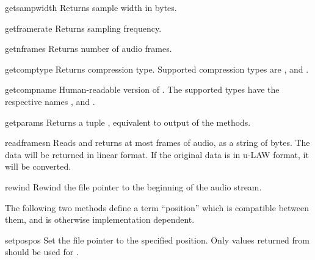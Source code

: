 \begin{methoddesc}[AU_read]{getsampwidth}{}
Returns sample width in bytes.
\end{methoddesc}

\begin{methoddesc}[AU_read]{getframerate}{}
Returns sampling frequency.
\end{methoddesc}

\begin{methoddesc}[AU_read]{getnframes}{}
Returns number of audio frames.
\end{methoddesc}

\begin{methoddesc}[AU_read]{getcomptype}{}
Returns compression type.
Supported compression types are ,  and .
\end{methoddesc}

\begin{methoddesc}[AU_read]{getcompname}{}
Human-readable version of . 
The supported types have the respective names ,  and .
\end{methoddesc}

\begin{methoddesc}[AU_read]{getparams}{}
Returns a tuple ,
equivalent to output of the  methods.
\end{methoddesc}

\begin{methoddesc}[AU_read]{readframes}{n}
Reads and returns at most  frames of audio, as a string of
bytes.  The data will be returned in linear format.  If the original
data is in u-LAW format, it will be converted.
\end{methoddesc}

\begin{methoddesc}[AU_read]{rewind}{}
Rewind the file pointer to the beginning of the audio stream.
\end{methoddesc}

The following two methods define a term ``position'' which is compatible
between them, and is otherwise implementation dependent.

\begin{methoddesc}[AU_read]{setpos}{pos}
Set the file pointer to the specified position.  Only values returned
from  should be used for .
\end{methoddesc}

